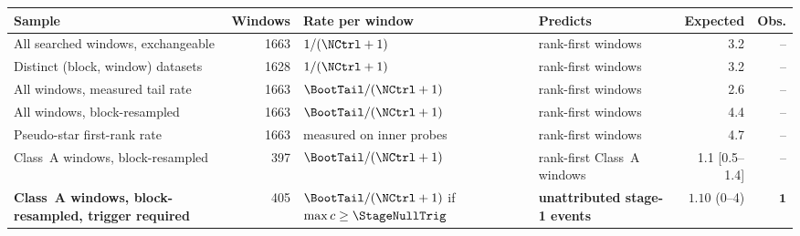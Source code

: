 \begin{tabular}{@{}p{}rp{}p{}rr@{}}
\toprule
Sample & Windows & Rate per window & Predicts & Expected & Obs. \\
\midrule
All searched windows, exchangeable & 1663 & $1/(\NCtrl+1)$ & rank-first windows & 3.2 & -- \\
Distinct (block, window) datasets & 1628 & $1/(\NCtrl+1)$ & rank-first windows & 3.2 & -- \\
All windows, measured tail rate & 1663 & $\BootTail/(\NCtrl+1)$ & rank-first windows & 2.6 & -- \\
All windows, block-resampled & 1663 & $\BootTail/(\NCtrl+1)$ & rank-first windows & 4.4 & -- \\
Pseudo-star first-rank rate & 1663 & measured on inner probes & rank-first windows & 4.7 & -- \\
Class~A windows, block-resampled & 397 & $\BootTail/(\NCtrl+1)$ & rank-first Class~A windows & 1.1 [0.5--1.4] & -- \\
\textbf{Class~A windows, block-resampled, trigger required} & 405 & $\BootTail/(\NCtrl+1)$ if $\max c\geq\StageNullTrig$ & \textbf{unattributed stage-1 events} & $\mathbf{1.10}$ (0--4) & $\mathbf{1}$ \\
\bottomrule
\end{tabular}
